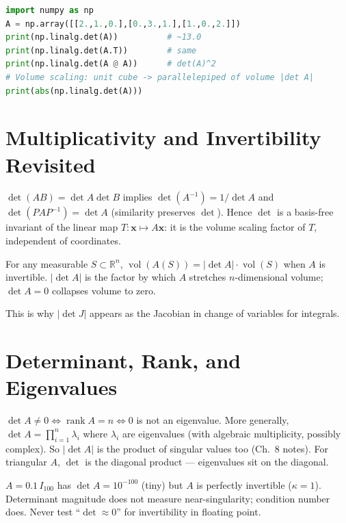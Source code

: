\begin{example}
\begin{lstlisting}[language=Python]
import numpy as np
A = np.array([[2.,1.,0.],[0.,3.,1.],[1.,0.,2.]])
print(np.linalg.det(A))          # ~13.0
print(np.linalg.det(A.T))        # same
print(np.linalg.det(A @ A))      # det(A)^2
# Volume scaling: unit cube -> parallelepiped of volume |det A|
print(abs(np.linalg.det(A)))
\end{lstlisting}
\end{example}


\section{Multiplicativity and Invertibility Revisited}
\label{sec:mult-inv}
$\det(AB)=\det A\det B$ implies $\det(A^{-1})=1/\det A$ and $\det(PAP^{-1})=\det A$ (similarity preserves $\det$). Hence $\det$ is a basis-free invariant of the linear map $T:\mathbf{x}\mapsto A\mathbf{x}$: it is the volume scaling factor of $T$, independent of coordinates.

\begin{theorem}
For any measurable $S\subset\mathbb{R}^n$, $\operatorname{vol}(A(S))=|\det A|\cdot\operatorname{vol}(S)$ when $A$ is invertible. $|\det A|$ is the factor by which $A$ stretches $n$-dimensional volume; $\det A=0$ collapses volume to zero.
\end{theorem}
This is why $|\det J|$ appears as the Jacobian in change of variables for integrals.

\section{Determinant, Rank, and Eigenvalues}
\label{sec:det-rank-eigen}
$\det A\neq0\iff\operatorname{rank}A=n\iff0$ is not an eigenvalue. More generally, $\det A=\prod_{i=1}^n\lambda_i$ where $\lambda_i$ are eigenvalues (with algebraic multiplicity, possibly complex). So $|\det A|$ is the product of singular values too (Ch.~8 notes). For triangular $A$, $\det$ is the diagonal product --- eigenvalues sit on the diagonal.

\begin{example}
$A=0.1\,I_{100}$ has $\det A=10^{-100}$ (tiny) but $A$ is perfectly invertible ($\kappa=1$). Determinant magnitude does not measure near-singularity; condition number does. Never test ``$\det\approx0$'' for invertibility in floating point.
\end{example}

